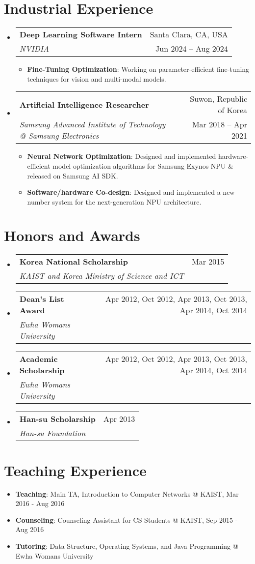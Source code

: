 \documentclass[letterpaper,oneside,11pt]{article}
\makeatletter
\newcommand{\resumeItem}[2]{
  \item\small{
    \textbf{#1}{: #2 \vspace{-2pt}}
  }
}
\newcommand{\resumeSubheading}[4]{
  \vspace{-2pt}\item
    \begin{tabularx}{0.97\textwidth}[t]{X@{\hspace{-5pt}}r}
      \textbf{#1} & #2 \\
      \textit{\small#3} & \small #4 \\
    \end{tabularx}\vspace{-6pt}
}
\newcommand{\awardsSubheading}[4]{
  \resumeSubheading{#1}{#2}{#3}{#4}\vspace{0pt}
}
\newcommand{\resumeSubHeadingListStart}{\begin{itemize}[leftmargin=*]}
\newcommand{\resumeSubHeadingListEnd}{\end{itemize}}
\newcommand{\resumeItemListStart}{\begin{itemize}}
\newcommand{\resumeItemListEnd}{\end{itemize}\vspace{-5pt}}
\makeatother
\begin{document}
\section{Industrial Experience}
\resumeSubHeadingListStart
    \resumeSubheading
    {Deep Learning Software Intern}{Santa Clara, CA, USA}
    {NVIDIA}{Jun 2024 -- Aug 2024}
    \resumeItemListStart
      \resumeItem{Fine-Tuning Optimization}{Working on parameter-efficient fine-tuning techniques for vision and multi-modal models.}
    \resumeItemListEnd
    \resumeSubheading
      {Artificial Intelligence Researcher}{Suwon, Republic of Korea}
      {Samsung Advanced Institute of Technology @ Samsung Electronics}{Mar 2018 -- Apr 2021}
      \resumeItemListStart
        \resumeItem{Neural Network Optimization}{Designed and implemented hardware-efficient model optimization algorithms for Samsung Exynos NPU \& released on Samsung AI SDK.}
        \resumeItem{Software/hardware Co-design}{Designed and implemented a new number system for the next-generation NPU architecture.}
      \resumeItemListEnd
  \resumeSubHeadingListEnd

\section{Honors and Awards}
  \resumeSubHeadingListStart
    \awardsSubheading{Korea National Scholarship}{Mar 2015}
    {KAIST and Korea Ministry of Science and ICT}{}
    \awardsSubheading{Dean's List Award}{Apr 2012, Oct 2012, Apr 2013, Oct 2013, Apr 2014, Oct 2014}
    {Ewha Womans University}{}
    \awardsSubheading{Academic Scholarship}{Apr 2012, Oct 2012, Apr 2013, Oct 2013, Apr 2014, Oct 2014}
    {Ewha Womans University}{}
    \awardsSubheading{Han-su Scholarship}{Apr 2013}
    {Han-su Foundation}{}
  \resumeSubHeadingListEnd

%

\section{Teaching Experience}
\resumeSubHeadingListStart
  \resumeItem{Teaching}{Main TA, Introduction to Computer Networks @ KAIST, Mar 2016 - Aug 2016}
  \resumeItem{Counseling}{Counseling Assistant for CS Students @ KAIST, Sep 2015 - Aug 2016}
  \resumeItem{Tutoring}{Data Structure, Operating Systems, and Java Programming @ Ewha Womans University}
\resumeSubHeadingListEnd
\end{document}
